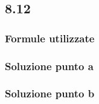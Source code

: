 \documentclass[../../main.tex]{subfiles}
\begin{document}
\subsection*{8.12}
\subsubsection*{Formule utilizzate}
\subsubsection*{Soluzione punto a}
\subsubsection*{Soluzione punto b}
\newpage
\end{document}
